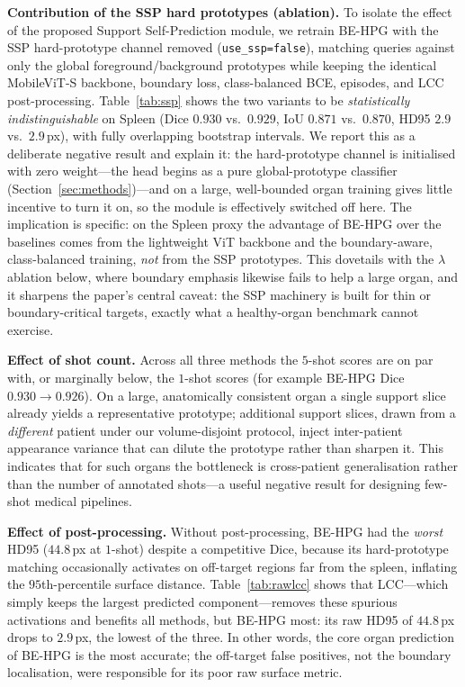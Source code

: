 \documentclass[conference]{IEEEtran}
\begin{document}
\textbf{Contribution of the SSP hard prototypes (ablation).} To isolate the effect of the
proposed Support Self-Prediction module, we retrain BE-HPG with the SSP hard-prototype channel
removed (\texttt{use\_ssp{=}false}), matching queries against only the global
foreground/background prototypes while keeping the identical MobileViT-S backbone, boundary loss,
class-balanced BCE, episodes, and LCC post-processing. Table~\ref{tab:ssp} shows the two variants
to be \emph{statistically indistinguishable} on Spleen (Dice $0.930$ vs.\ $0.929$, IoU $0.871$
vs.\ $0.870$, HD95 $2.9$ vs.\ $2.9$\,px), with fully overlapping bootstrap intervals. We report
this as a deliberate negative result and explain it: the hard-prototype channel is initialised
with zero weight---the head begins as a pure global-prototype classifier
(Section~\ref{sec:methods})---and on a large, well-bounded organ training gives little incentive to
turn it on, so the module is effectively switched off here. The implication is specific: on the
Spleen proxy the advantage of BE-HPG over the baselines comes from the lightweight ViT backbone and
the boundary-aware, class-balanced training, \emph{not} from the SSP prototypes. This dovetails
with the $\lambda$ ablation below, where boundary emphasis likewise fails to help a large organ,
and it sharpens the paper's central caveat: the SSP machinery is built for thin or boundary-critical
targets, exactly what a healthy-organ benchmark cannot exercise.

\textbf{Effect of shot count.} Across all three methods the $5$-shot scores are on par with, or
marginally below, the $1$-shot scores (for example BE-HPG Dice $0.930\!\rightarrow\!0.926$). On a
large, anatomically consistent organ a single support slice already yields a representative
prototype; additional support slices, drawn from a \emph{different} patient under our
volume-disjoint protocol, inject inter-patient appearance variance that can dilute the prototype
rather than sharpen it. This indicates that for such organs the bottleneck is cross-patient
generalisation rather than the number of annotated shots---a useful negative result for designing
few-shot medical pipelines.



\textbf{Effect of post-processing.} Without post-processing, BE-HPG had the \emph{worst} HD95
($44.8$\,px at $1$-shot) despite a competitive Dice, because its hard-prototype matching
occasionally activates on off-target regions far from the spleen, inflating the $95$th-percentile
surface distance. Table~\ref{tab:rawlcc} shows that LCC---which simply keeps the largest predicted
component---removes these spurious activations and benefits all methods, but BE-HPG most: its raw
HD95 of $44.8$\,px drops to $2.9$\,px, the lowest of the three. In other words, the core organ
prediction of BE-HPG is the most accurate; the off-target false positives, not the boundary
localisation, were responsible for its poor raw surface metric.
\end{document}
